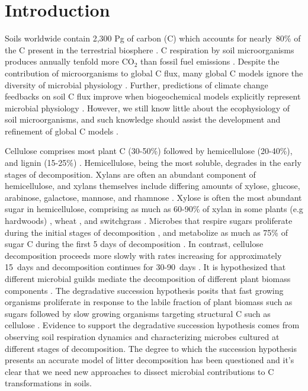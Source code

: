 \section{Introduction}
Soils worldwide contain 2,300 Pg of carbon (C) which accounts for nearly~80\%
of the C present in the terrestrial biosphere
\citep{Amundson_2001,BATJES_1996}. C respiration by soil microorganisms
produces annually tenfold more CO$_{2}$ than fossil fuel emissions
\citep{chapin2002principles}. Despite the contribution of microorganisms to
global C flux, many global C models ignore the diversity of microbial
physiology \citep{Allison2010,Six2006,Treseder2011}. Further, predictions of climate
change feedbacks on soil C flux improve when biogeochemical models explicitly
represent microbial physiology \citep{Wieder2013}. However, we still know
little about the ecophysiology of soil microorganisms, and such knowledge
should assist the development and refinement of global C models
\citep{Bradford2008,Neff_2001,McGuire2010}.

Cellulose comprises most plant C (30-50\%) followed by hemicellulose (20-40\%),
and lignin (15-25\%) \citep{Lynd2002}. Hemicellulose, being the most soluble,
degrades in the early stages of decomposition. Xylans are often an abundant
component of hemicellulose, and xylans themselves include differing amounts of
xylose, glucose, arabinose, galactose, mannose, and rhamnose \citep{Saha2003}.
Xylose is often the most abundant sugar in hemicellulose, comprising as much as
60-90\% of xylan in some plants (e.g hardwoods) \citep{Spiridon2008}, wheat
\citep{Sun2005}, and switchgrass \citep{Bunnell2013}. Microbes that respire
sugars proliferate during the initial stages of decomposition
\citep{Garrett1951,Alexander1964}, and metabolize as much as 75\% of sugar
C during the first 5 days of decomposition \citep{Engelking2007}. In contrast,
cellulose decomposition proceeds more slowly with rates increasing for
approximately 15~days and decomposition continues for 30-90~days
\citep{Hu1997,Engelking2007}. It is hypothesized that different microbial
guilds mediate the decomposition of different plant biomass components
\citep{Hu1997,Rui2009,AnneliseHKjoller2002,Bastian_2009}. The degradative
succession hypothesis posits that fast growing organisms proliferate in
response to the labile fraction of plant biomass such as sugars
\citep{Garrett1963,Bremer1994} followed by slow growing organisms targeting
structural C such as cellulose \citep{Garrett1963}. Evidence to support the
degradative succession hypothesis comes from observing soil respiration
dynamics and characterizing microbes cultured at different stages of
decomposition. The degree to which the succession hypothesis presents an
accurate model of litter decomposition has been questioned
\citep{AnneliseHKjoller2002,Frankland_1998,Osono_2005} and it's clear that we
need new approaches to dissect microbial contributions to C transformations in
soils.

